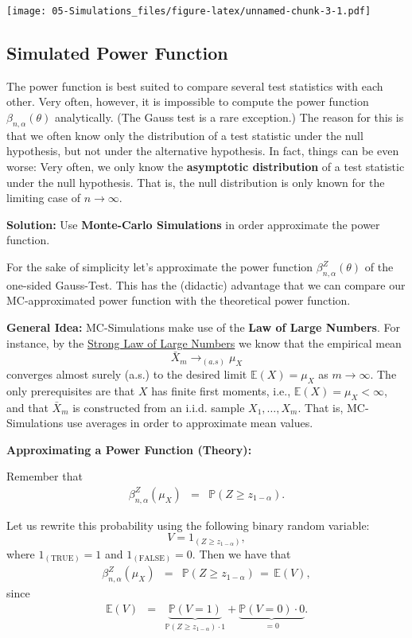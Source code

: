 \documentclass[
]{book}
\begin{document}
\texttt{[image: 05-Simulations\_files/figure-latex/unnamed-chunk-3-1.pdf]}

\hypertarget{simulated-power-function}{%
\subsection{Simulated Power Function}\label{simulated-power-function}}

The power function is best suited to compare several test statistics with each other. Very often, however, it is impossible to compute the power function \(\beta_{n,\alpha}(\theta)\) analytically. (The Gauss test is a rare exception.) The reason for this is that we often know only the distribution of a test statistic under the null hypothesis, but not under the alternative hypothesis. In fact, things can be even worse: Very often, we only know the \textbf{asymptotic distribution} of a test statistic under the null hypothesis. That is, the null distribution is only known for the limiting case of \(n\to\infty\).

\textbf{Solution:}
Use \textbf{Monte-Carlo Simulations} in order approximate the power function.

For the sake of simplicity let's approximate the power function \(\beta^Z_{n,\alpha}(\theta)\) of the one-sided Gauss-Test. This has the (didactic) advantage that we can compare our MC-approximated power function with the theoretical power function.

\textbf{General Idea:}
MC-Simulations make use of the \textbf{Law of Large Numbers}. For instance, by the \href{http://www.statlect.com/asylln1.htm}{Strong Law of Large Numbers} we know that the empirical mean
\[\bar{X}_m\to_{(a.s)}\mu_X\]
converges almost surely (a.s.) to the desired limit \(\mathbb{E}(X)=\mu_X\) as \(m\to\infty\). The only prerequisites are that \(X\) has finite first moments, i.e., \(\mathbb{E}(X)=\mu_X<\infty\), and that \(\bar{X}_m\) is constructed from an i.i.d. sample \(X_1,\dots,X_m\). That is, MC-Simulations use averages in order to approximate mean values.

\textbf{Approximating a Power Function (Theory):}

Remember that
\[
\begin{array}{rcl}
\beta^{Z}_{n,\alpha}(\mu_X)
&=&\mathbb{P}(Z \geq z_{1-\alpha}).
\end{array}
\]

Let us rewrite this probability using the following binary random variable:
\[
V=1_{(Z \geq z_{1-\alpha})},
\]
where \(1_{(\text{TRUE})}=1\) and \(1_{(\text{FALSE})}=0\).
Then we have that
\[
\begin{array}{rcl}
\beta^{Z}_{n,\alpha}(\mu_X)
&=&\mathbb{P}(Z \geq z_{1-\alpha})\,=\,\mathbb{E}(V),
\end{array}
\]
since
\[
\begin{array}{rcl}
\mathbb{E}(V)&=&\underbrace{\mathbb{P}(V=1)}_{\mathbb{P}(Z \geq z_{1-\alpha})\cdot 1}+\underbrace{\mathbb{P}(V=0)\cdot 0}_{=0}.%
\end{array}
\]
\end{document}
